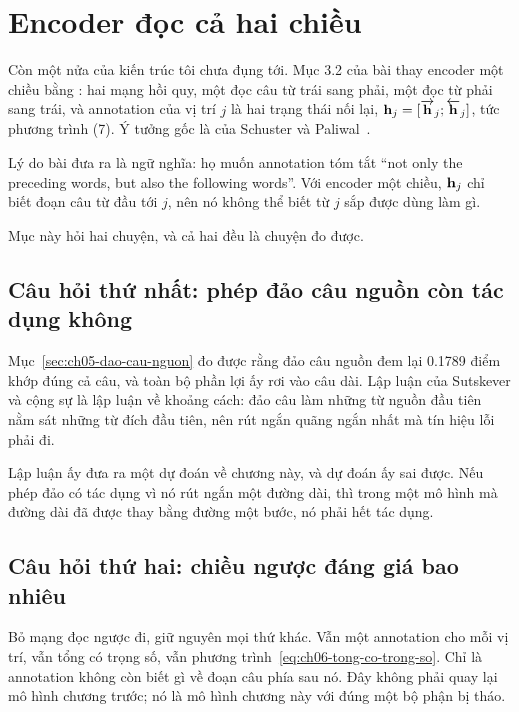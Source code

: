 \section{Encoder đọc cả hai chiều}
\label{sec:ch06-hai-chieu}

%
Còn một nửa của kiến trúc tôi chưa đụng tới. Mục 3.2 của bài thay encoder một
chiều bằng : hai mạng hồi quy,
một đọc câu từ trái sang phải, một đọc từ phải sang trái, và annotation của vị
trí \(j\) là hai trạng thái nối lại,
\(\mathbf{h}_j = [\overrightarrow{\mathbf{h}}_j ; \overleftarrow{\mathbf{h}}_j]\),
tức phương trình (7). Ý tưởng gốc là của Schuster và
Paliwal~\autocite{schuster1997bidirectional}.

Lý do bài đưa ra là ngữ nghĩa: họ muốn annotation tóm tắt \enquote{not only the
preceding words, but also the following words}. Với encoder một chiều,
\(\mathbf{h}_j\) chỉ biết đoạn câu từ đầu tới \(j\), nên nó không thể biết từ
\(j\) sắp được dùng làm gì.

Mục này hỏi hai chuyện, và cả hai đều là chuyện đo được.

\subsection*{Câu hỏi thứ nhất: phép đảo câu nguồn còn tác dụng không}

%
Mục~\ref{sec:ch05-dao-cau-nguon} đo được rằng đảo câu nguồn đem lại 0.1789 điểm
khớp đúng cả câu, và toàn bộ phần lợi ấy rơi vào câu dài. Lập luận của
Sutskever và cộng sự là lập luận về khoảng cách: đảo câu làm những từ nguồn đầu
tiên nằm sát những từ đích đầu tiên, nên rút ngắn quãng ngắn nhất mà tín hiệu
lỗi phải đi.

Lập luận ấy đưa ra một dự đoán về chương này, và dự đoán ấy sai được. Nếu phép
đảo có tác dụng vì nó rút ngắn một đường dài, thì trong một mô hình mà đường
dài đã được thay bằng đường một bước, nó phải hết tác dụng.

\subsection*{Câu hỏi thứ hai: chiều ngược đáng giá bao nhiêu}

%
Bỏ mạng đọc ngược đi, giữ nguyên mọi thứ khác. Vẫn một annotation cho mỗi vị
trí, vẫn tổng có trọng số, vẫn phương trình~\eqref{eq:ch06-tong-co-trong-so}.
Chỉ là annotation không còn biết gì về đoạn câu phía sau nó. Đây không phải
quay lại mô hình chương trước; nó là mô hình chương này với đúng một bộ phận bị
tháo.

